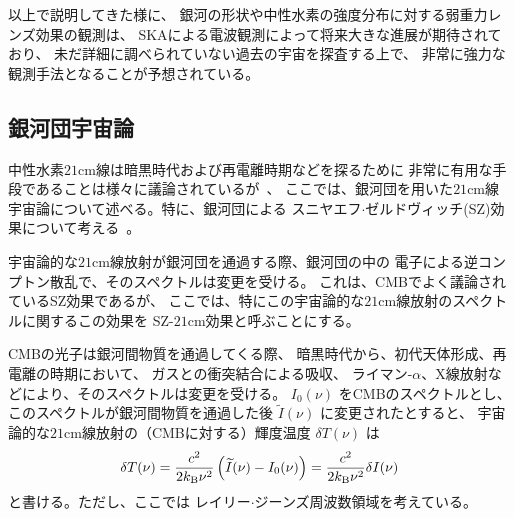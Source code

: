 
\bigskip

以上で説明してきた様に、
銀河の形状や中性水素の強度分布に対する弱重力レンズ効果の観測は、
SKAによる電波観測によって将来大きな進展が期待されており、
未だ詳細に調べられていない過去の宇宙を探査する上で、
非常に強力な観測手法となることが予想されている。



\subsection{銀河団宇宙論}\label{cosmology.s2.ss7}



中性水素$21$cm線は暗黒時代および再電離時期などを探るために
非常に有用な手段であることは様々に議論されているが~\citep{Pritchard:2011xb}、
ここでは、銀河団を用いた$21$cm線宇宙論について述べる。特に、銀河団による
スニヤエフ$\cdot$ゼルドヴィッチ(SZ)効果について考える~\citep{Colafrancesco2014}。

宇宙論的な$21$cm線放射が銀河団を通過する際、銀河団の中の
電子による逆コンプトン散乱で、そのスペクトルは変更を受ける。
これは、CMBでよく議論されているSZ効果であるが、
ここでは、特にこの宇宙論的な$21$cm線放射のスペクトルに関するこの効果を
SZ-$21$cm効果と呼ぶことにする。 

CMBの光子は銀河間物質を通過してくる際、
暗黒時代から、初代天体形成、再電離の時期において、
ガスとの衝突結合による吸収、
ライマン-$\alpha$、X線放射などにより、そのスペクトルは変更を受ける。
$I_0 (\nu)$ をCMBのスペクトルとし、
このスペクトルが銀河間物質を通過した後 $\widetilde{I}(\nu)$ に変更されたとすると、
宇宙論的な$21$cm線放射の（CMBに対する）輝度温度 $\delta T (\nu)$ は
\begin{equation}
\delta T (\nu)
= \frac{c^2}{2 k_{\rm B} \nu^2} \left( \widetilde{I} (\nu) - I_0 (\nu) \right) 
= \frac{c^2}{2 k_{\rm B} \nu^2} \delta I (\nu)
\end{equation}
と書ける。ただし、ここでは レイリー$\cdot$ジーンズ周波数領域を考えている。

